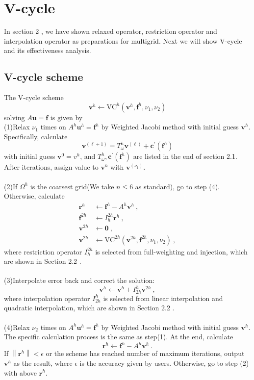 \documentclass[a4paper,twocolumn]{article}
\theoremstyle{definition}
\begin{document}
\section{V-cycle}
In section 2 , we have shown relaxed operator, restriction operator and interpolation operator as preparations for multigrid. Next we will show V-cycle and its effectiveness analysis.
\subsection{V-cycle scheme}
The V-cycle scheme
$$
\mathbf{v}^h \gets \mathrm{VC}^h(\mathbf{v}^h,\mathbf{f}^h,\nu_1,\nu_2) 
$$
solving $A\textbf{u} = \textbf{f}$ is given by\\
(1)Relax $\nu_1$ times on $A^h\textbf{u}^h = \textbf{f}^h$ by Weighted Jacobi method with initial guess $\mathbf{v}^h$. Specifically, calculate $$\mathbf{v}^{(\ell+1)} =T_{\omega}^h \mathbf{v}^{(\ell)}+\mathbf{c}^{\prime}(\mathbf{f}^h)$$
with initial guess $\mathbf{v}^{0} = v^h$, and $T_{\omega}^h,\mathbf{c}^{\prime}(\mathbf{f}^h)$ are listed in the end of section 2.1.
After iterations, assign value to $\mathbf{v}^h$ with $\mathbf{v}^{(\nu_1)}$.\\\\
(2)If $\Omega^h$ is the coarsest grid(We take $n \le 6$ as standard), go to step (4).
Otherwise, calculate 
$$
\begin{aligned}
\mathbf{r}^h &\gets \textbf{f}^h - A^h\textbf{v}^h \ , \\ 
\mathbf{f}^{2h} &\gets I_h^{2h} \mathbf{r}^h \ , \\
\mathbf{v}^{2h} &\gets \mathbf{0} \ , \\
\mathbf{v}^{2h} &\gets \mathrm{VC}^{2h}(\mathbf{v}^{2h},\mathbf{f}^{2h},\nu_1,\nu_2) \ ,
\end{aligned}
$$
where restriction operator $I_h^{2h}$ is selected from full-weighting and injection, which are shown in Section 2.2 .\\\\
(3)Interpolate error back and correct the solution:
$$
\mathbf{v}^{h} \gets \mathbf{v}^{h} +I_{2h}^{h} \mathbf{v}^{2h} \ , 
$$
where interpolation operator $I_{2h}^{h}$ is selected from linear interpolation and quadratic interpolation, which are shown in Section 2.2 .\\\\
(4)Relax $\nu_2$ times on $A^h\textbf{u}^h = \textbf{f}^h$ by Weighted Jacobi method with initial guess $\mathbf{v}^h$. The specific calculation process is the same as step(1). At the end, calculate 
$$
\mathbf{r}^h \gets \textbf{f}^h - A^h\textbf{v}^h \ .
$$
If  $\left \| \mathbf{r}^h \right \| < \epsilon$ or the scheme has reached number of maximum iterations, output $\textbf{v}^h$ as the result, where $\epsilon$ is the accuracy given by users. Otherwise, go to step (2) with above $\mathbf{r}^h$.
\end{document}
